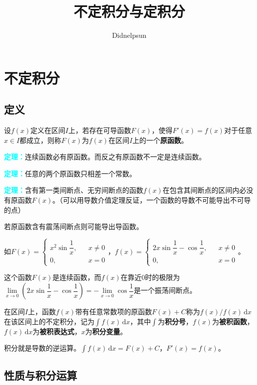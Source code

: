 \documentclass[UTF8, 12pt]{ctexart}
\author{Didnelpsun}
\title{不定积分与定积分}
\date{}
\begin{document}
\maketitle
\pagestyle{empty}
\thispagestyle{empty}
\tableofcontents
\thispagestyle{empty}
\newpage
\pagestyle{plain}
\setcounter{page}{1}
\section{不定积分}

\subsection{定义}

设$f(x)$定义在区间$I$上，若存在可导函数$F(x)$，使得$F'(x)=f(x)$对于任意$x\in I$都成立，则称$F(x)$为$f(x)$在区间$I$上的一个\textbf{原函数}。

\textcolor{aqua}{\textbf{定理：}}连续函数必有原函数。而反之有原函数不一定是连续函数。

\textcolor{aqua}{\textbf{定理：}}任意的两个原函数只相差一个常数。

\textcolor{aqua}{\textbf{定理：}}含有第一类间断点、无穷间断点的函数$f(x)$在包含其间断点的区间内必没有原函数$F(x)$。（可以用导数介值定理反证，一个函数的导数不可能导出不可导的点）

若原函数含有震荡间断点则可能导出导函数。

如$F(x)=\left\{\begin{array}{lcl}
    x^2\sin\dfrac{1}{x}, & & x\neq 0 \\
    0, & & x=0
\end{array}\right.$，$f(x)=\left\{\begin{array}{lcl}
    2x\sin\dfrac{1}{x}-\cos\dfrac{1}{x}, & & x\neq 0 \\
    0, & & x=0
\end{array}\right.$。

这个函数$F(x)$是连续函数，而$f(x)$在靠近0时的极限为$\lim\limits_{x\to 0}(2x\sin\dfrac{1}{x}-\cos\dfrac{1}{x})=-\lim\limits_{x\to 0}\cos\dfrac{1}{x}$是一个振荡间断点。

在区间$I$上，函数$f(x)$带有任意常数项的原函数$F(x)+C$称为$f(x)/f(x)\,\textrm{d}x$在该区间上的不定积分，记为$\int f(x)\,\textrm{d}x$，其中$\int$为\textbf{积分号}，$f(x)$为\textbf{被积函数}，$f(x)\,\textrm{d}x$为\textbf{被积表达式}，$x$为\textbf{积分变量}。

积分就是导数的逆运算。$\int f(x)\,\textrm{d}x=F(x)+C$，$F'(x)=f(x)$。 

\subsection{性质与积分运算}
\end{document}
